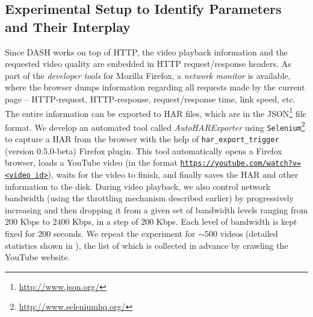 \subsection{Experimental Setup to Identify Parameters and Their Interplay} 
Since \ac{DASH} works on top of \ac{HTTP}, the video playback information and the requested video quality are embedded in HTTP request/response headers.
As part of the {\em developer tools} for Mozilla Firefox, a {\em network monitor} is available, where the browser dumps information regarding all requests made by the current page -- \ac{HTTP}-request, \ac{HTTP}-response, request/response time, link speed, etc.
The entire information can be exported to \ac{HAR} files, which are in the \ac{JSON}\footnote{\url{http://www.json.org/}} file format.
We develop an automated tool called {\em AutoHARExporter} using \texttt{Selenium}\footnote{\url{http://www.seleniumhq.org/}} to capture a \ac{HAR} from the browser with the help of \texttt{har\_export\_trigger} (version 0.5.0-beta) Firefox plugin.
This tool automatically opens a Firefox browser, loads a YouTube video (in the format {\tt \url{https://youtube.com/watch?v=<video id>}}), waits for the video to finish, and finally saves the \ac{HAR} and other information to the disk.
During video playback, we also control network bandwidth (using the throttling mechanism described earlier) by progressively increasing and then dropping it from a given set of bandwidth levels ranging from $200$ Kbps to $2400$ Kbps, in a step of $200$ Kbps.
Each level of bandwidth is kept fixed for $200$ seconds. 
We repeat the experiment for $\sim500$ videos (detailed statistics shown in \tbl{\ref{table:chap03s1:statvid}}), the list of which is collected in advance by crawling the YouTube website.

